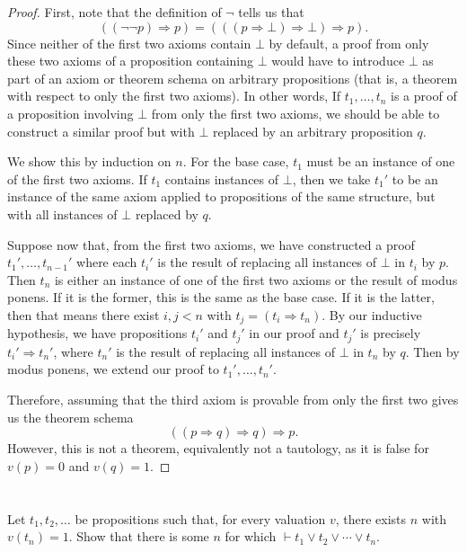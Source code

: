 \documentclass[12pt]{article}
\newenvironment{problem}
    {\begin{lrbox}{\mybox}\begin{minipage}{0.98\textwidth}}
    {\end{minipage}\end{lrbox}\begin{center}\framebox[\textwidth]{\usebox{\mybox}}\end{center}}
\renewcommand{\implies}{\Rightarrow}
\newcommand{\proves}{\vdash}
\begin{document}
\begin{proof}
    First, note that the definition of $\lnot$ tells us that
    \[
        ((\lnot \lnot p) \implies p) = (((p \implies \bot) \implies \bot) \implies p).
    \]
    Since neither of the first two axioms contain $\bot$ by default, a proof from only these two axioms of a proposition containing $\bot$ would have to introduce $\bot$ as part of an axiom or theorem schema on arbitrary propositions (that is, a theorem with respect to only the first two axioms). In other words, If $t_1, \dots, t_n$ is a proof of a proposition involving $\bot$ from only the first two axioms, we should be able to construct a similar proof but with $\bot$ replaced by an arbitrary proposition $q$. 
    
    We show this by induction on $n$. For the base case, $t_1$ must be an instance of one of the first two axioms. If $t_1$ contains instances of $\bot$, then we take $t_1'$ to be an instance of the same axiom applied to propositions of the same structure, but with all instances of $\bot$ replaced by $q$.
    
    Suppose now that, from the first two axioms, we have constructed a proof $t_1', \dots, t_{n-1}'$ where each $t_i'$ is the result of replacing all instances of $\bot$ in $t_i$ by $p$. Then $t_n$ is either an instance of one of the first two axioms or the result of modus ponens. If it is the former, this is the same as the base case. If it is the latter, then that means there exist $i, j < n$ with $t_j = (t_i \implies t_n)$. By our inductive hypothesis, we have propositions $t_i'$ and $t_j'$ in our proof and $t_j'$ is precisely $t_i' \implies t_n'$, where $t_n'$ is the result of replacing all instances of $\bot$ in $t_n$ by $q$. Then by modus ponens, we extend our proof to $t_1', \dots, t_n'$.
    
    Therefore, assuming that the third axiom is provable from only the first two gives us the theorem schema
    \[
        ((p \implies q) \implies q) \implies p.
    \]
    However, this is not a theorem, equivalently not a tautology, as it is false for $v(p) = 0$ and $v(q) = 1$.
    
    
    
\end{proof}

\newpage
\section{}
\begin{problem}
    Let $t_1, t_2, \dots$ be propositions such that, for every valuation $v$, there exists $n$ with $v(t_n) = 1$. Show that there is some $n$ for which $\proves t_1 \lor t_2 \lor \cdots \lor t_n$.
\end{problem}
\end{document}
